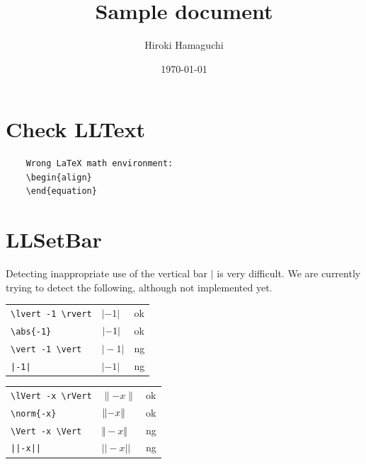 \documentclass[a4paper]{article}
\newcommand{\tA}[1]{\textcolor{cA}{#1}}
\newcommand{\tD}[1]{\textcolor{cD}{#1}}
\begin{document}
\title{Sample document}
\author{Hiroki Hamaguchi}
\date{\today}
\maketitle





\newpage
\appendix

\renewcommand\thesection{Appendix \Alph{section}}

\section{Check LLText}

\begin{verbatim}
	Wrong LaTeX math environment:
	\begin{align}
	\end{equation}
\end{verbatim}

\section{LLSetBar}

Detecting inappropriate use of the vertical bar $|$ is very difficult.
We are currently trying to detect the following, although not implemented yet.

\begin{table}[H]
	\centering
	\begin{tabular}{lll}
		\verb#\lvert -1 \rvert# & $\lvert -1 \rvert$ & \tA{ok} \\
		\verb#\abs{-1}#         & $\abs{-1}$         & \tA{ok} \\
		\verb#\vert -1 \vert#   & $\vert -1 \vert$   & \tD{ng} \\
		\verb#|-1|#             & $|-1|$             & \tD{ng} \\
	\end{tabular}
\end{table}


\begin{table}[H]
	\centering
	\begin{tabular}{lll}
		\verb#\lVert -x \rVert# & $\lVert -x \rVert$ & \tA{ok} \\
		\verb#\norm{-x}#        & $\norm{-x}$        & \tA{ok} \\
		\verb#\Vert -x \Vert#   & $\Vert -x \Vert$   & \tD{ng} \\
		\verb#||-x||#           & $||-x||$           & \tD{ng} \\
	\end{tabular}
\end{table}
\end{document}
